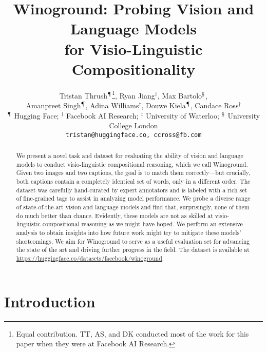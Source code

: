\documentclass[10pt,twocolumn,letterpaper]{article}
\begin{document}
\title{Winoground: Probing Vision and Language Models\\ for Visio-Linguistic Compositionality} 

\newcommand*\samethanks[1][\value{footnote}]{\footnotemark[#1]}
\author{Tristan Thrush$^\mathparagraph$\thanks{Equal contribution. TT, AS, and DK conducted most of the work for this paper when they were at Facebook AI Research.}, Ryan Jiang$^\ddagger$, Max Bartolo$^\mathsection$,\\ Amanpreet Singh$^\mathparagraph$, Adina Williams$^\dagger$, Douwe Kiela$^\mathparagraph$, Candace Ross$^\dagger$\samethanks\\
$^\mathparagraph$ Hugging Face; $^\dagger$ Facebook AI Research; $^\ddagger$ University of Waterloo; $^\mathsection$ University College London\\
{\tt\small tristan@huggingface.co, ccross@fb.com}
}
\maketitle



\begin{abstract}
We present a novel task and dataset for evaluating the ability of vision and language models to 
conduct visio-linguistic compositional reasoning, which we call Winoground. Given two images and two captions, the goal is to match them correctly---but crucially, both captions contain a completely identical set of words, only in a different order. The dataset was carefully hand-curated by expert annotators and is labeled with a rich set of fine-grained tags to assist in analyzing model performance. We probe a diverse range of state-of-the-art vision and language models and find that, surprisingly, none of them do much better than chance. Evidently, these models are not as skilled at visio-linguistic compositional reasoning as we might have hoped. We perform an extensive analysis to obtain insights into how future work might try to mitigate these models' shortcomings. We aim for Winoground to serve as a useful evaluation set for advancing the state of the art and driving further progress in the field. The dataset is available at \scriptsize{\url{https://huggingface.co/datasets/facebook/winoground}}.
\end{abstract}

\section{Introduction}
\label{sec:intro}
\end{document}
